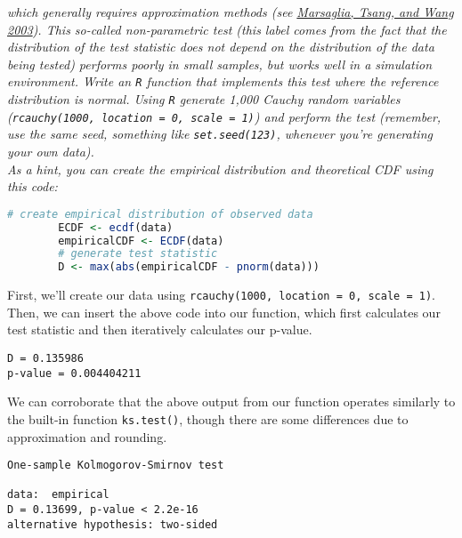 \documentclass[12pt,letterpaper]{article}
\begin{document}
	
	\noindent \emph{which generally requires approximation methods (see \href{https://core.ac.uk/download/pdf/25787785.pdf}{Marsaglia, Tsang, and Wang 2003}). This so-called non-parametric test (this label comes from the fact that the distribution of the test statistic does not depend on the distribution of the data being tested) performs poorly in small samples, but works well in a simulation environment. Write an \texttt{R} function that implements this test where the reference distribution is normal. Using \texttt{R} generate 1,000 Cauchy random variables (\texttt{rcauchy(1000, location = 0, scale = 1)}) and perform the test (remember, use the same seed, something like \texttt{set.seed(123)}, whenever you're generating your own data).}\\
	
	\noindent \emph{As a hint, you can create the empirical distribution and theoretical CDF using this code:}
	
	\begin{lstlisting}[language=R]
		# create empirical distribution of observed data
		ECDF <- ecdf(data)
		empiricalCDF <- ECDF(data)
		# generate test statistic
		D <- max(abs(empiricalCDF - pnorm(data))) \end{lstlisting}
	
\noindent	First, we'll create our data using \texttt{rcauchy(1000, location = 0, scale = 1)}. Then, we can insert the above code into our function, which first calculates our test statistic and then iteratively calculates our p-value.
	
		 
		
			\begin{lstlisting}
D = 0.135986 
p-value = 0.004404211 \end{lstlisting}
		
		\noindent We can corroborate that the above output from our function operates similarly to the built-in function \texttt{ks.test()}, though there are some differences due to approximation and rounding. 
		
				 
		
					\begin{lstlisting}	
One-sample Kolmogorov-Smirnov test

data:  empirical
D = 0.13699, p-value < 2.2e-16
alternative hypothesis: two-sided \end{lstlisting}
\end{document}
